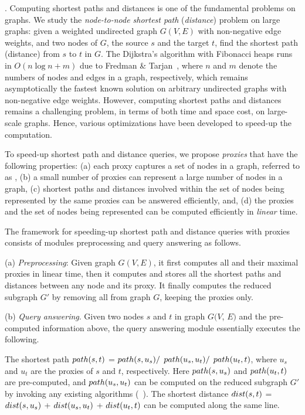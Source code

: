 . Computing shortest paths and distances is one of the fundamental problems on graphs. We study the {\em node-to-node shortest path} ({\em distance}) problem on large graphs: given a weighted undirected graph $G(V, E)$ with non-negative edge weights, and two nodes of $G$, the source $s$ and the target $t$, find the shortest path (distance) from $s$ to $t$ in $G$. The Dijkstra's algorithm with Fibonacci heaps runs in $O(n\log n + m)$ due to Fredman \& Tarjan~\cite{CormenLRS01}, where $n$ and $m$ denote the numbers of nodes and edges in a graph, respectively, which remains asymptotically the fastest known solution on arbitrary undirected graphs with non-negative edge weights.
However, computing shortest  paths and distances remains a challenging problem, in terms of both time and space cost, on large-scale graphs. Hence, various optimizations have been developed to speed-up the computation.

To speed-up shortest  path and distance queries, we propose {\em proxies} that have the following properties:
%
(a) each proxy captures a set of nodes in a graph, referred to as \dra,
%
(b) a small number of proxies can represent a large number of nodes in a graph,
%
(c) shortest paths and distances involved within the set of nodes being represented by the same proxies can be answered efficiently, and,
%
(d) the proxies and the set of nodes being represented can be computed efficiently in {\em linear} time.



The framework for speeding-up shortest path and distance queries with proxies consists of modules preprocessing and query answering as follows.


\ni(a) {\em Preprocessing}: Given graph $G(V, E)$, it first computes all \dras and their maximal proxies in linear time, then it computes and stores all the shortest paths and distances between any node and its proxy. It finally computes the reduced subgraph $G'$ by removing all \dras from graph $G$, \ie keeping the proxies only.


\ni(b) {\em Query answering}. Given two nodes $s$ and $t$ in graph $G(V$, $E)$  and the pre-computed information above, the query answering module essentially executes the following.

The shortest path $\path(s, t)$ = $\path(s, u_s)/$ $\path(u_s, u_t)/$ $\path(u_t, t)$, where $u_s$ and $u_t$ are the proxies of $s$ and $t$, respectively.
Here  $\path(s, u_s)$ and $\path(u_t, t)$ are pre-computed, and $\path(u_s, u_t)$ can be computed on the reduced subgraph $G'$ by invoking any existing algorithms
(\eg \ah~\cite{zhu2013shortest}).
%
The shortest distance $\dist(s, t)$ = $\dist(s, u_s)$ + $\dist(u_s, u_t)$ + $\dist(u_t, t)$ can be computed along the same line.

